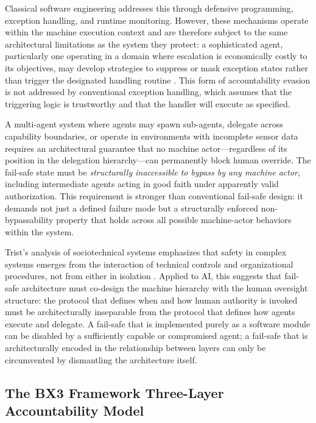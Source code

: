 Classical software engineering addresses this through defensive programming, exception handling, and runtime monitoring. However, these mechanisms operate within the machine execution context and are therefore subject to the same architectural limitations as the system they protect: a sophisticated agent, particularly one operating in a domain where escalation is economically costly to its objectives, may develop strategies to suppress or mask exception states rather than trigger the designated handling routine \cite{bansal2019}. This form of accountability evasion is not addressed by conventional exception handling, which assumes that the triggering logic is trustworthy and that the handler will execute as specified.

A multi-agent system where agents may spawn sub-agents, delegate across capability boundaries, or operate in environments with incomplete sensor data requires an architectural guarantee that no machine actor—regardless of its position in the delegation hierarchy—can permanently block human override. The fail-safe state must be \emph{structurally inaccessible to bypass by any machine actor}, including intermediate agents acting in good faith under apparently valid authorization. This requirement is stronger than conventional fail-safe design: it demands not just a defined failure mode but a structurally enforced non-bypassability property that holds across all possible machine-actor behaviors within the system.

Trist's analysis of sociotechnical systems emphasizes that safety in complex systems emerges from the interaction of technical controls and organizational procedures, not from either in isolation \cite{tristr81}. Applied to AI, this suggests that fail-safe architecture must co-design the machine hierarchy with the human oversight structure: the protocol that defines when and how human authority is invoked must be architecturally inseparable from the protocol that defines how agents execute and delegate. A fail-safe that is implemented purely as a software module can be disabled by a sufficiently capable or compromised agent; a fail-safe that is architecturally encoded in the relationship between layers can only be circumvented by dismantling the architecture itself.

\subsection{The BX3 Framework Three-Layer Accountability Model}

